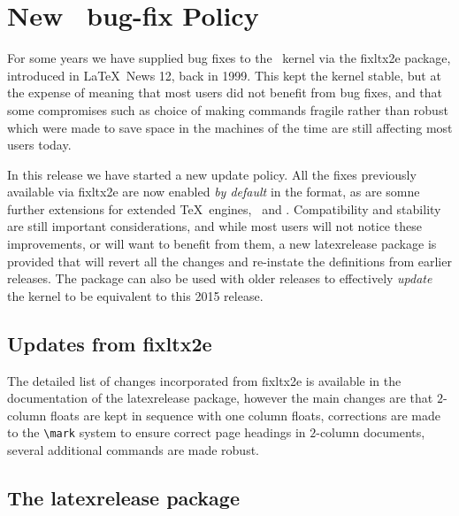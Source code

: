 \documentclass{ltnews}
\begin{document}
\maketitle

\tableofcontents

\bigskip

\section{New \LaTeXe\ bug-fix Policy}

For some years we have supplied bug fixes to the \LaTeXe\ kernel via the
\textsf{fixltx2e} package, introduced in \LaTeX\ News 12, back in 1999. This
kept the kernel stable, but at the expense of meaning that most users did not
benefit from bug fixes, and that some compromises such as choice of making
commands fragile rather than robust which were made to save space in the
machines of the time are still affecting most users today.

In this release we have started a new update policy. All the fixes previously
available via \textsf{fixltx2e} are now enabled \emph{by default} in the
format, as are somne further extensions for extended \TeX\ engines, \eTeX\,
 and . Compatibility and stability are still
important considerations, and while most users will not notice these
improvements, or will want to benefit from them, a new \textsf{latexrelease}
package is provided that will revert all the changes and re-instate the
definitions from earlier releases. The package can also be used with older
releases to effectively \emph{update} the kernel to be equivalent to this 2015
release.

\subsection{Updates from \textsf{fixltx2e}}

The detailed list of changes incorporated from \textsf{fixltx2e} is available
in the documentation of the \textsf{latexrelease} package, however the main
changes are that $2$-column floats are kept in sequence with one column floats,
corrections are made to the \verb|\mark| system to ensure correct page headings
in $2$-column documents, several additional commands are made robust.

\subsection{The \textsf{latexrelease} package}
\end{document}

